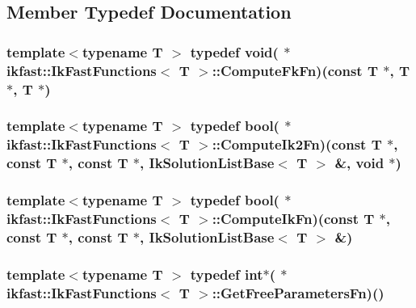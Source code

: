 \subsection{Member Typedef Documentation}
\hypertarget{classikfast_1_1IkFastFunctions_ad69044909936c82f15dc7412bba148bd}{
\subsubsection[{Compute\-Fk\-Fn}]{\setlength{\rightskip}{0pt plus 5cm}template$<$typename T $>$ typedef void( $\ast$ {\bf ikfast\-::\-Ik\-Fast\-Functions}$<$ T $>$\-::Compute\-Fk\-Fn)(const T $\ast$, T $\ast$, T $\ast$)}}\label{classikfast_1_1IkFastFunctions_ad69044909936c82f15dc7412bba148bd}
\hypertarget{classikfast_1_1IkFastFunctions_ac7350210edd45a662ff961ffc4bcca0f}{
\subsubsection[{Compute\-Ik2\-Fn}]{\setlength{\rightskip}{0pt plus 5cm}template$<$typename T $>$ typedef bool( $\ast$ {\bf ikfast\-::\-Ik\-Fast\-Functions}$<$ T $>$\-::Compute\-Ik2\-Fn)(const T $\ast$, const T $\ast$, const T $\ast$, {\bf Ik\-Solution\-List\-Base}$<$ T $>$ \&, void $\ast$)}}\label{classikfast_1_1IkFastFunctions_ac7350210edd45a662ff961ffc4bcca0f}
\hypertarget{classikfast_1_1IkFastFunctions_a4bf1d6c1c81b69e2990d9e4bac57ca6f}{
\subsubsection[{Compute\-Ik\-Fn}]{\setlength{\rightskip}{0pt plus 5cm}template$<$typename T $>$ typedef bool( $\ast$ {\bf ikfast\-::\-Ik\-Fast\-Functions}$<$ T $>$\-::Compute\-Ik\-Fn)(const T $\ast$, const T $\ast$, const T $\ast$, {\bf Ik\-Solution\-List\-Base}$<$ T $>$ \&)}}\label{classikfast_1_1IkFastFunctions_a4bf1d6c1c81b69e2990d9e4bac57ca6f}
\hypertarget{classikfast_1_1IkFastFunctions_aa86be2aa954cb58428a9266e49637f92}{
\subsubsection[{Get\-Free\-Parameters\-Fn}]{\setlength{\rightskip}{0pt plus 5cm}template$<$typename T $>$ typedef int$\ast$( $\ast$ {\bf ikfast\-::\-Ik\-Fast\-Functions}$<$ T $>$\-::Get\-Free\-Parameters\-Fn)()}}\label{classikfast_1_1IkFastFunctions_aa86be2aa954cb58428a9266e49637f92}
